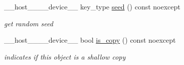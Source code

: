 \begin{DoxyCompactItemize}
\+\_\+\+\_\+host\+\_\+\+\_\+\+\_\+\+\_\+device\+\_\+\+\_\+ key\+\_\+type \hyperlink{classwarpcore_1_1CountingHashTable_a404f39442f096f294cd879b0710e5416}{seed} () const noexcept
\begin{DoxyCompactList}\small\item\em get random seed \end{DoxyCompactList}\item 
\+\_\+\+\_\+host\+\_\+\+\_\+\+\_\+\+\_\+device\+\_\+\+\_\+ bool \hyperlink{classwarpcore_1_1CountingHashTable_abd203ab693aa931917013e11c23d444c}{is\+\_\+copy} () const noexcept
\begin{DoxyCompactList}\small\item\em indicates if this object is a shallow copy \end{DoxyCompactList}\end{DoxyCompactItemize}
